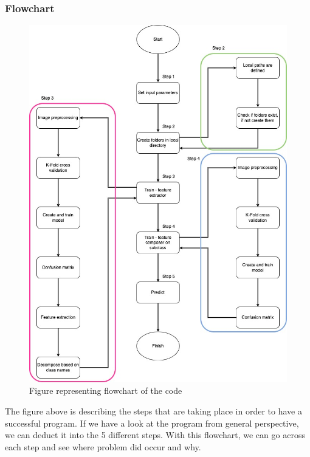 \subsubsection{Flowchart}

\begin{figure}[H]
    \centerline{\includegraphics[scale=0.552]{img/DeTraCDiagram.jpg}}
    \caption{Figure representing flowchart of the code}
\end{figure}

The figure above is describing the steps that are taking place in order to have a successful program. If we have a look at the program from general perspective, we can deduct it into the 5 different steps. With this flowchart, we can go across each step and see where problem did occur and why. 

